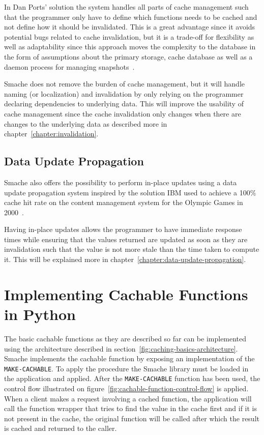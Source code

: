 In Dan Ports' solution the system handles all parts of cache management such that the programmer only have to define which functions needs to be cached and not define how it should be invalidated. This is a great advantage since it avoids potential bugs related to cache invalidation, but it is a trade-off for flexibility as well as adaptability since this approach moves the complexity to the database in the form of assumptions about the primary storage, cache database as well as a daemon process for managing snapshots~\cite{paper:liskov}.

Smache does not remove the burden of cache management, but it will handle naming (or localization) and invalidation by only relying on the programmer declaring dependencies to underlying data. This will improve the usability of cache management since the cache invalidation only changes when there are changes to the underlying data as described more in chapter~\ref{chapter:invalidation}.


\subsection{Data Update Propagation}
\label{subsec:model_data_update_propagation}

Smache also offers the possibility to perform in-place updates using a data update propagation system inspired by the solution IBM used to achieve a 100\% cache hit rate on the content management system for the Olympic Games in 2000~\cite{paper:ibm, paper:ibm-extended}.

Having in-place updates allows the programmer to have immediate response times while ensuring that the values returned are updated as soon as they are invalidation such that the value is not more stale than the time taken to compute it. This will be explained more in chapter~\ref{chapter:data-update-propagation}.


\section{Implementing Cachable Functions in Python}
\label{sec:implementing_cachable_functions_in_python}

The basic cachable functions as they are described so far can be implemented using the architecture described in section~\ref{fig:caching-basics-architecture}. Smache implements the cachable function by exposing an implementation of the \verb$MAKE-CACHABLE$. To apply the procedure the Smache library must be loaded in the application and applied. After the \verb$MAKE-CACHABLE$ function has been used, the control flow illustrated on figure~\ref{fig:cachable-function-control-flow} is applied. When a client makes a request involving a cached function, the application will call the function wrapper that tries to find the value in the cache first and if it is not present in the cache, the original function will be called after which the result is cached and returned to the caller.

